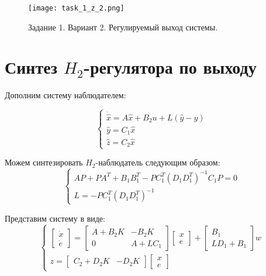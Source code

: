 \begin{figure}[]
    \centering
    \texttt{[image: task\_1\_z\_2.png]}
    \caption{\label{fig:task1_2_4}Задание 1. Вариант 2. Регулируемый выход системы.}
\end{figure}

\pagebreak

\section{Синтез $H_2$-регулятора по выходу}

Дополним систему наблюдателем:

\begin{equation}
    \begin{cases}
        \dot{\hat{x}} = A\hat{x} + B_2u + L(\hat{y} - y)\\
        \hat{y} = C_1\hat{x} \\
        \hat{z} = C_2\hat{x}
    \end{cases}
\end{equation}

Можем синтезировать $H_2$-наблюдатель следующим образом:
\begin{equation}
    \begin{cases}
        AP + PA^T + B_1B_1^T - PC_1^T(D_1D_1^T)^{-1}C_1P = 0\\
        L = -PC_1^T(D_1D_1^T)^{-1}
    \end{cases}
\end{equation}

Представим систему в виде:
\begin{equation}
    \begin{cases}
        \begin{bmatrix}
            \dot{x} \\ \dot{e}
        \end{bmatrix} =
        \begin{bmatrix}
            A + B_2K & -B_2K \\
            0 & A + LC_1
        \end{bmatrix} \begin{bmatrix} x \\ e\end{bmatrix} +
        \begin{bmatrix}
            B_1 \\ LD_1 + B_1
        \end{bmatrix}w \\

        z = \begin{bmatrix}
            C_2 + D_2K & -D_2K
        \end{bmatrix} \begin{bmatrix} x \\ e\end{bmatrix}
    \end{cases}
\end{equation}

